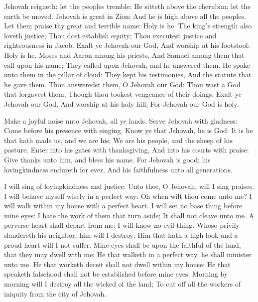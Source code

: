 Jehovah reigneth; let the peoples tremble: He sitteth above the cherubim; let the earth be moved.  Jehovah is great in Zion; And he is high above all the peoples.  Let them praise thy great and terrible name: Holy is he.  The king’s strength also loveth justice; Thou dost establish equity; Thou executest justice and righteousness in Jacob.  Exalt ye Jehovah our God, And worship at his footstool: Holy is he.  Moses and Aaron among his priests, And Samuel among them that call upon his name; They called upon Jehovah, and he answered them.  He spake unto them in the pillar of cloud: They kept his testimonies, And the statute that he gave them.  Thou answeredst them, O Jehovah our God: Thou wast a God that forgavest them, Though thou tookest vengeance of their doings.  Exalt ye Jehovah our God, And worship at his holy hill; For Jehovah our God is holy. 

Make a joyful noise unto Jehovah, all ye lands.  Serve Jehovah with gladness: Come before his presence with singing.  Know ye that Jehovah, he is God: It is he that hath made us, and we are his; We are his people, and the sheep of his pasture.  Enter into his gates with thanksgiving, And into his courts with praise: Give thanks unto him, and bless his name.  For Jehovah is good; his lovingkindness endureth for ever, And his faithfulness unto all generations. 

I will sing of lovingkindness and justice: Unto thee, O Jehovah, will I sing praises.  I will behave myself wisely in a perfect way: Oh when wilt thou come unto me? I will walk within my house with a perfect heart.  I will set no base thing before mine eyes: I hate the work of them that turn aside; It shall not cleave unto me.  A perverse heart shall depart from me: I will know no evil thing.  Whoso privily slandereth his neighbor, him will I destroy: Him that hath a high look and a proud heart will I not suffer.  Mine eyes shall be upon the faithful of the land, that they may dwell with me: He that walketh in a perfect way, he shall minister unto me.  He that worketh deceit shall not dwell within my house: He that speaketh falsehood shall not be established before mine eyes.  Morning by morning will I destroy all the wicked of the land; To cut off all the workers of iniquity from the city of Jehovah. 

